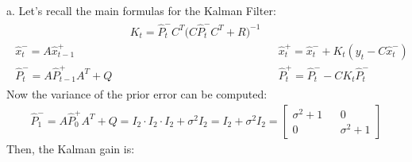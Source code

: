 \Answer[number={8}]
a. Let's recall the main formulas for the Kalman Filter:
\begin{align*}
    \begin{matrix}
        {} && K_t=\hat{P}_t^-C^T\bigl(C\hat{P}_t^-C^T+R\bigr)^{-1} && {}\\
        \hat{x}_t^-=A\hat{x}_{t-1}^+ && {} && \hat{x}_t^+=\hat{x}_t^-+K_t(y_t-C\hat{x}_t^-)\\
        \hat{P}_t^-=A\hat{P}_{t-1}^+A^T+Q && {} && \hat{P}_t^+=\hat{P}_t^--CK_t\hat{P}_t^-
    \end{matrix}
\end{align*}
Now the variance of the prior error can be computed:
\begin{align*}
    \hat{P}_1^-
    =A\hat{P}_{0}^+A^T+Q
    =I_2\cdot I_2\cdot I_2 + \sigma^2I_2
    =I_2+\sigma^2I_2
    =
    \begin{bmatrix}
        \sigma^2+1&&0\\0&&\sigma^2+1
    \end{bmatrix}
\end{align*}
Then, the Kalman gain is:
